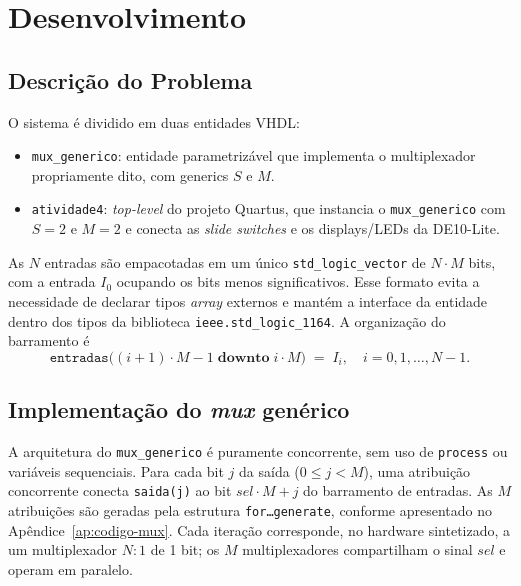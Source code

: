 \documentclass[12pt,a4paper, brazil]{article}
\begin{document}
\section{Desenvolvimento}

\subsection{Descrição do Problema}

O sistema é dividido em duas entidades VHDL:

\begin{itemize}
    \item \texttt{mux\_generico}: entidade parametrizável que implementa o multiplexador propriamente dito, com generics $S$ e $M$.
    \item \texttt{atividade4}: \textit{top-level} do projeto Quartus, que instancia o \texttt{mux\_generico} com $S=2$ e $M=2$ e conecta as \textit{slide switches} e os displays/LEDs da DE10-Lite.
\end{itemize}

As $N$ entradas são empacotadas em um único \texttt{std\_logic\_vector} de $N \cdot M$ bits, com a entrada $I_0$ ocupando os bits menos significativos. Esse formato evita a necessidade de declarar tipos \textit{array} externos e mantém a interface da entidade dentro dos tipos da biblioteca \texttt{ieee.std\_logic\_1164}. A organização do barramento é
\begin{equation}
    \texttt{entradas}\bigl((i+1)\cdot M - 1 \;\textbf{downto}\; i \cdot M\bigr) \;=\; I_i, \quad i = 0,1,\ldots,N-1.
\end{equation}

\subsection{Implementação do \textit{mux} genérico}

A arquitetura do \texttt{mux\_generico} é puramente concorrente, sem uso de \texttt{process} ou variáveis sequenciais. Para cada bit $j$ da saída ($0 \le j < M$), uma atribuição concorrente conecta \texttt{saida(j)} ao bit $sel \cdot M + j$ do barramento de entradas. As $M$ atribuições são geradas pela estrutura \texttt{for\ldots generate}, conforme apresentado no Apêndice~\ref{ap:codigo-mux}. Cada iteração corresponde, no hardware sintetizado, a um multiplexador $N{:}1$ de 1 bit; os $M$ multiplexadores compartilham o sinal $sel$ e operam em paralelo.
\end{document}
